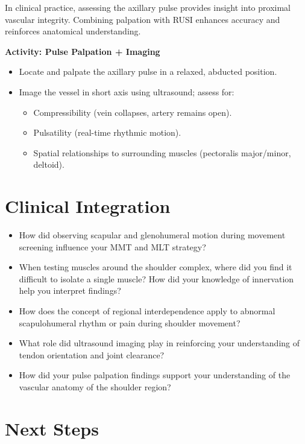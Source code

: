 In clinical practice, assessing the axillary pulse provides insight into proximal vascular integrity. Combining palpation with RUSI enhances accuracy and reinforces anatomical understanding.

\begin{labactivitybox}
\textbf{Activity: Pulse Palpation + Imaging}
\begin{itemize}
  \item Locate and palpate the axillary pulse in a relaxed, abducted position.
  \item Image the vessel in short axis using ultrasound; assess for:
    \begin{itemize}
      \item Compressibility (vein collapses, artery remains open).
      \item Pulsatility (real-time rhythmic motion).
      \item Spatial relationships to surrounding muscles (pectoralis major/minor, deltoid).
    \end{itemize}
\end{itemize}
\end{labactivitybox}


\section*{Clinical Integration}

\begin{itemize}
  \item How did observing scapular and glenohumeral motion during movement screening influence your MMT and MLT strategy?
  \item When testing muscles around the shoulder complex, where did you find it difficult to isolate a single muscle? How did your knowledge of innervation help you interpret findings?
  \item How does the concept of regional interdependence apply to abnormal scapulohumeral rhythm or pain during shoulder movement?
  \item What role did ultrasound imaging play in reinforcing your understanding of tendon orientation and joint clearance?
  \item How did your pulse palpation findings support your understanding of the vascular anatomy of the shoulder region?
\end{itemize}

\section*{Next Steps}

